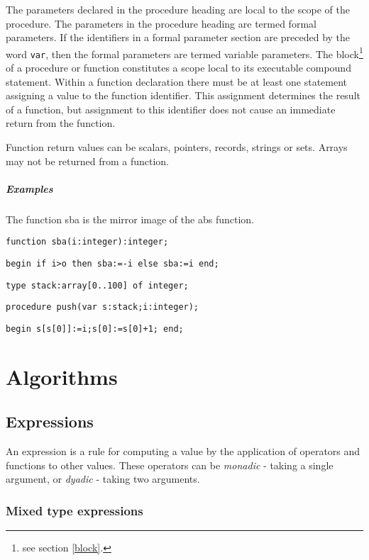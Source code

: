 {The parameters declared in the procedure heading are local to the scope of the
procedure. The parameters in the procedure heading are termed formal
parameters. If the identifiers in a formal parameter section are preceded by
the word \texttt{var}, then the formal parameters are termed variable parameters.
The block\footnote{%
see section \ref{block}.
} of a procedure or function constitutes a scope local to its executable compound
statement. Within a function declaration there must be at least one statement
assigning a value to the function identifier. This assignment determines the
result of a function, but assignment to this identifier does not cause an immediate
return from the function. 

Function return values can be scalars, pointers, records, strings or sets. Arrays
may not be returned from a function.


\paragraph{Examples}

The function sba is the mirror image of the abs function.

\texttt{function sba(i:integer):integer; }

\texttt{begin if i>o then sba:=-i else sba:=i end;}

\texttt{type stack:array{[}0..100{]} of integer;}

\texttt{procedure push(var s:stack;i:integer);}

\texttt{begin s{[}s{[}0{]}{]}:=i;s{[}0{]}:=s{[}0{]}+1; end;}


\chapter{Algorithms}


\section{Expressions}

An expression is a rule for computing a value by the application of operators
and functions to other values. These operators can be \emph{monadic} - taking
a single argument, or \emph{dyadic} - taking two arguments. 


\subsection{Mixed type expressions}

}
